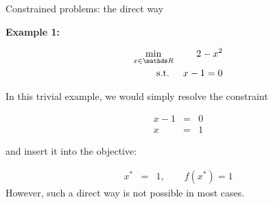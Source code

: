 \documentclass[11pt,compress,t,notes=noshow, xcolor=table]{beamer}
\begin{document}
\begin{vbframe}{Constrained problems: the direct way}

\textbf{Example 1:}

\begin{footnotesize}
\begin{eqnarray*}
\min_{x\in \R} && 2 - x^2 \\
\text{s.t. } && x - 1 = 0
\end{eqnarray*}
\end{footnotesize}

In this trivial example, we would simply resolve the constraint 

\begin{eqnarray*}
x - 1 &=& 0 \\
x &=& 1
\end{eqnarray*}

and insert it into the objective: 

\vspace*{-0.5cm}

\begin{eqnarray*}
x^\ast &=& 1, \qquad f(x^\ast) = 1
\end{eqnarray*}
However, such a direct way is not possible in most cases. 











\end{vbframe}
\end{document}
